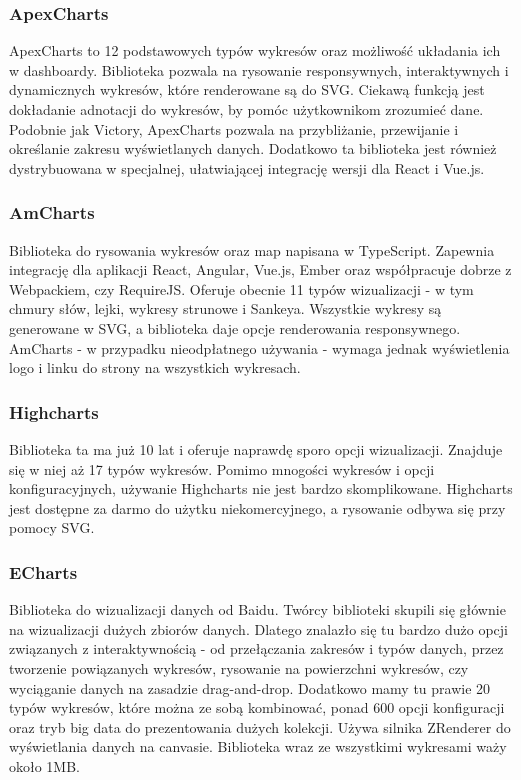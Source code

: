 \documentclass[12pt,a4paper]{article} %
\begin{document}
    \subsubsection{ApexCharts}
        ApexCharts to 12 podstawowych typów wykresów oraz możliwość układania ich w dashboardy. Biblioteka pozwala na rysowanie responsywnych, interaktywnych i dynamicznych wykresów, które renderowane są do SVG. Ciekawą funkcją jest dokładanie adnotacji do wykresów, by pomóc użytkownikom zrozumieć dane. Podobnie jak Victory, ApexCharts pozwala na przybliżanie, przewijanie i określanie zakresu wyświetlanych danych. Dodatkowo ta biblioteka jest również dystrybuowana w specjalnej, ułatwiającej integrację wersji dla React i Vue.js.
     
    \subsubsection{AmCharts}
        Biblioteka do rysowania wykresów oraz map napisana w TypeScript. Zapewnia integrację dla aplikacji React, Angular, Vue.js, Ember oraz współpracuje dobrze z Webpackiem, czy RequireJS. Oferuje obecnie 11 typów wizualizacji - w tym chmury słów, lejki, wykresy strunowe i Sankeya. Wszystkie wykresy są generowane w SVG, a biblioteka daje opcje renderowania responsywnego. AmCharts - w przypadku nieodpłatnego używania - wymaga jednak wyświetlenia logo i linku do strony na wszystkich wykresach.

    \subsubsection{Highcharts}
        Biblioteka ta ma już 10 lat i oferuje naprawdę sporo opcji wizualizacji. Znajduje się w niej aż 17 typów wykresów. Pomimo mnogości wykresów i opcji konfiguracyjnych, używanie Highcharts nie jest bardzo skomplikowane. Highcharts jest dostępne za darmo do użytku niekomercyjnego, a rysowanie odbywa się przy pomocy SVG.
    
    \subsubsection{ECharts}
        Biblioteka do wizualizacji danych od Baidu. Twórcy biblioteki skupili się głównie na wizualizacji dużych zbiorów danych. Dlatego znalazło się tu bardzo dużo opcji związanych z interaktywnością - od przełączania zakresów i typów danych, przez tworzenie powiązanych wykresów, rysowanie na powierzchni wykresów, czy wyciąganie danych na zasadzie drag-and-drop. Dodatkowo mamy tu prawie 20 typów wykresów, które można ze sobą kombinować, ponad 600 opcji konfiguracji oraz tryb big data do prezentowania dużych kolekcji. Używa silnika ZRenderer do wyświetlania danych na canvasie. Biblioteka wraz ze wszystkimi wykresami waży około 1MB.
    
\end{document}
